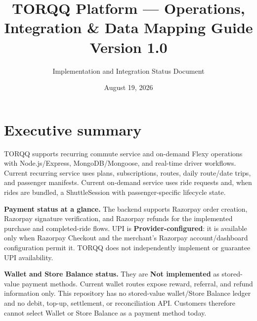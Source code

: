 \documentclass[11pt,a4paper]{article}
\title{\textbf{TORQQ Platform --- Operations, Integration \& Data Mapping Guide}\\[0.35em]\large Version 1.0}
\author{Implementation and Integration Status Document}
\date{August 19, 2026}
\newcommand{\status}[1]{\textbf{#1}}
\begin{document}
\maketitle
\thispagestyle{fancy}

\begin{center}
\end{center}

\tableofcontents
\newpage

\section{Executive summary}
TORQQ supports recurring commute service and on-demand Flexy operations with Node.js/Express, MongoDB/Mongoose, and real-time driver workflows. Current recurring service uses plans, subscriptions, routes, daily route/date trips, and passenger manifests. Current on-demand service uses ride requests and, when rides are bundled, a ShuttleSession with passenger-specific lifecycle state.

\textbf{Payment status at a glance.} The backend supports Razorpay order creation, Razorpay signature verification, and Razorpay refunds for the implemented purchase and completed-ride flows. UPI is \status{Provider-configured}: it is available only when Razorpay Checkout and the merchant's Razorpay account/dashboard configuration permit it. TORQQ does not independently implement or guarantee UPI availability.

\textbf{Wallet and Store Balance status.} They are \status{Not implemented} as stored-value payment methods. Current wallet routes expose reward, referral, and refund information only. This repository has no stored-value wallet/Store Balance ledger and no debit, top-up, settlement, or reconciliation API. Customers therefore cannot select Wallet or Store Balance as a payment method today.
\end{document}
